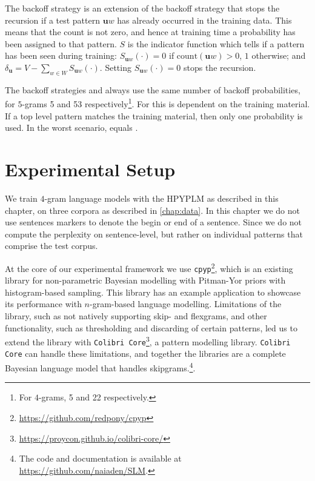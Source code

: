  The \BOL backoff strategy is an extension of the \BOF backoff strategy that stops the recursion if a test pattern $\mathbf{u}w$ has already occurred in the training data. This means that the count is not zero, and hence at training time a probability has been assigned to that pattern. $S$ is the indicator function which tells if a pattern has been seen during training: $S_{\mathbf{u}w}(\cdot) = 0$ if $\mathrm{count}(\mathbf{u}w) > 0$, $1$ otherwise; and $\delta_{\mathbf{u}} = V-\sum_{w\in W} S_{\mathbf{u}w}(\cdot)$. Setting $S_{\mathbf{u}w}(\cdot) = 0$ stops the recursion.

The backoff strategies \BON and \BOF always use the same number of backoff probabilities, for $5$-grams 5 and 53 respectively\footnote{For $4$-grams, 5 and 22 respectively.}. For \BOL this is dependent on the training material. If a top level pattern matches the training material, then only one probability is used. In the worst scenario, \BOL equals \BOF.

\section{Experimental Setup}

We train $4$-gram language models with the HPYPLM as described in this chapter, on three corpora as described in \cref{chap:data}. In this chapter we do not use sentences markers to denote the begin or end of a sentence. Since we do not compute the perplexity on sentence-level, but rather on individual patterns that comprise the test corpus.

At the core of our experimental framework we use \texttt{cpyp}\footnote{\url{https://github.com/redpony/cpyp}}, which is an existing library for non-parametric Bayesian modelling with Pitman-Yor priors with histogram-based sampling\autocite{blunsom2009note}. This library has an example application to showcase its performance with $n$-gram-based language modelling. Limitations of the library, such as not natively supporting skip- and flexgrams, and other functionality, such as thresholding and discarding of certain patterns, led us to extend the library with \texttt{Colibri Core}\footnote{\url{https://proycon.github.io/colibri-core/}}, a pattern modelling library. \texttt{Colibri Core} can handle these limitations\autocite{gompel2016efficient}, and together the libraries are a complete Bayesian language model that handles skipgrams.\footnote{The code and documentation is available at \url{https://github.com/naiaden/SLM}.}.

